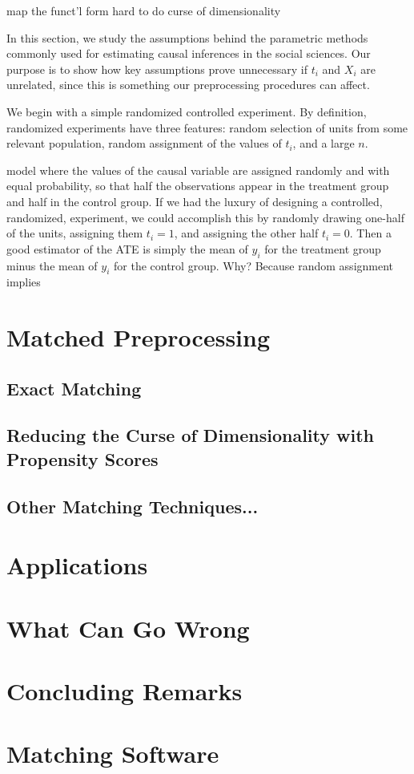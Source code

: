 \documentclass[11pt,titlepage]{article}
\begin{document}
map the funct'l form 
hard to do
curse of dimensionality

In this section, we study the assumptions behind the parametric
methods commonly used for estimating causal inferences in the social
sciences.  Our purpose is to show how key assumptions prove
unnecessary if $t_i$ and $X_i$ are unrelated, since this is something
our preprocessing procedures can affect.

We begin with a simple randomized controlled experiment.  By
definition, randomized experiments have three features:  random
selection of units from some relevant population, random assignment of
the values of $t_i$, and a large $n$.  

model where the values of the causal variable are assigned randomly
and with equal probability, so that half the observations appear in
the treatment group and half in the control group.  If we had the
luxury of designing a controlled, randomized, experiment, we could
accomplish this by randomly drawing one-half of the units, assigning
them $t_i=1$, and assigning the other half $t_i=0$.  Then a good
estimator of the ATE is simply the mean of $y_i$ for the treatment
group minus the mean of $y_i$ for the control group.  Why?  Because
random assignment implies

\section{Matched Preprocessing}

\subsection{Exact Matching}

\subsection{Reducing the Curse of Dimensionality with Propensity Scores}

\subsection{Other Matching Techniques...}

\section{Applications}

\section{What Can Go Wrong}

\section{Concluding Remarks}

\appendix
\section{Matching Software}




\end{document}
